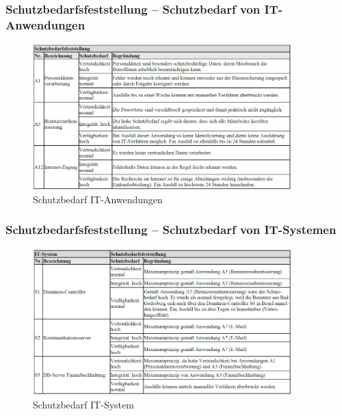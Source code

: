 \documentclass[10pt,a4paper]{article}
\begin{document}
\subsubsection*{Schutzbedarfsfeststellung – Schutzbedarf von IT-Anwendungen}
\begin{figure}[H]
    \begin{center}
    \includegraphics[width=10cm]{images/Schutzbedarf IT-Anwendungen.png}
    \caption{Schutzbedarf IT-Anwendungen}
    \label{Schutzbedarf IT-Anwendungen}
    \end{center}
\end{figure}


\subsubsection*{Schutzbedarfsfeststellung – Schutzbedarf von IT-Systemen}
\begin{figure}[H]
    \begin{center}
    \includegraphics[width=10cm]{images/Schutzbedarf IT-System.png}
    \caption{Schutzbedarf IT-System}
    \label{Schutzbedarf IT-System}
    \end{center}
\end{figure}

\pagebreak
\end{document}
